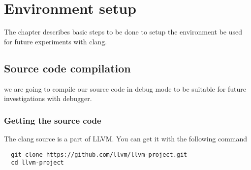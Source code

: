 \chapter{Environment setup}

The chapter describes basic steps to be done to setup the environment
be used for future experiments with clang.

\section{Source code compilation}

we are going to compile our source code in debug mode to be suitable
for future investigations with debugger.

\subsection{Getting the source code}

The clang source is a part of LLVM. You can get it with the following
command
\begin{verbatim}
  git clone https://github.com/llvm/llvm-project.git
  cd llvm-project
\end{verbatim}

